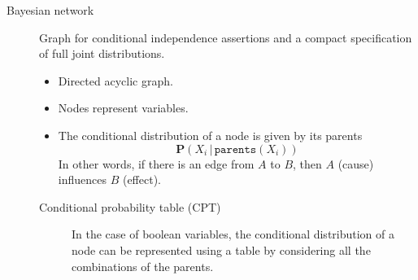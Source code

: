 \begin{description}
    \item[Bayesian network] 
        Graph for conditional independence assertions and a compact specification of full joint distributions.
        \begin{itemize}
            \item Directed acyclic graph.
            \item Nodes represent variables.
            \item The conditional distribution of a node is given by its parents 
                \[ \textbf{P}(X_i \,\vert\, \texttt{parents}(X_i)) \]
                In other words, if there is an edge from $A$ to $B$, then $A$ (cause) influences $B$ (effect).
        \end{itemize}

        \begin{description}
            \item[Conditional probability table (CPT)] 
                In the case of boolean variables, the conditional distribution of a node can be represented using 
                a table by considering all the combinations of the parents.


\end{description}
\end{description}
